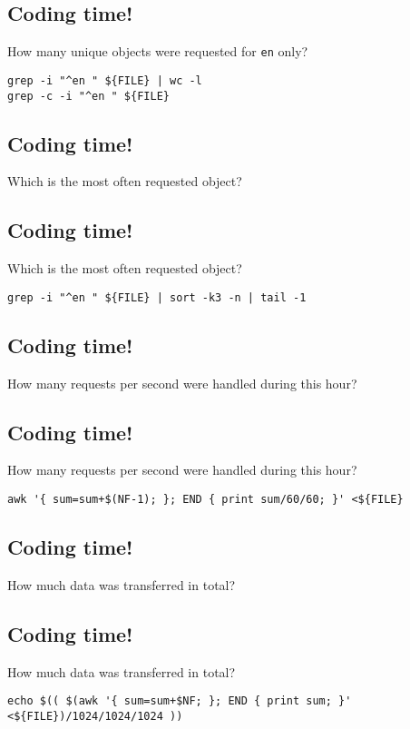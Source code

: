 \documentclass[xga]{xdvislides}
\begin{document}
\subsection{Coding time!}
How many unique objects were requested for {\tt en} only?
\begin{verbatim}
grep -i "^en " ${FILE} | wc -l
grep -c -i "^en " ${FILE}
\end{verbatim}

\subsection{Coding time!}
Which is the most often requested object?

\subsection{Coding time!}
Which is the most often requested object?
\begin{verbatim}
grep -i "^en " ${FILE} | sort -k3 -n | tail -1
\end{verbatim}

\subsection{Coding time!}
How many requests per second were handled during this hour?

\subsection{Coding time!}
How many requests per second were handled during this hour?
\begin{verbatim}
awk '{ sum=sum+$(NF-1); }; END { print sum/60/60; }' <${FILE}
\end{verbatim}

\subsection{Coding time!}
How much data was transferred in total?

\subsection{Coding time!}
How much data was transferred in total?
\begin{verbatim}
echo $(( $(awk '{ sum=sum+$NF; }; END { print sum; }' <${FILE})/1024/1024/1024 ))
\end{verbatim}
\end{document}
